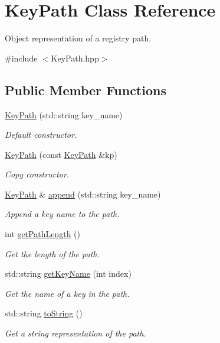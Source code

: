 \hypertarget{class_key_path}{}\section{Key\+Path Class Reference}
\label{class_key_path}


Object representation of a registry path.  




{\ttfamily \#include $<$Key\+Path.\+hpp$>$}

\subsection*{Public Member Functions}
\begin{DoxyCompactItemize}
\item 
\hyperlink{class_key_path_ae333110e571e2126ce2e9a19f4900ab7}{Key\+Path} (std\+::string key\+\_\+name)
\begin{DoxyCompactList}\small\item\em Default constructor. \end{DoxyCompactList}\item 
\hyperlink{class_key_path_af70143f36c7946a29f89e4cc4e5b11e9}{Key\+Path} (const \hyperlink{class_key_path}{Key\+Path} \&kp)
\begin{DoxyCompactList}\small\item\em Copy constructor. \end{DoxyCompactList}\item 
\hyperlink{class_key_path}{Key\+Path} \& \hyperlink{class_key_path_a05e16fcea85250d3d350700246e677b4}{append} (std\+::string key\+\_\+name)
\begin{DoxyCompactList}\small\item\em Append a key name to the path. \end{DoxyCompactList}\item 
int \hyperlink{class_key_path_a3c43f10b8630dfb6fbd3709fb26447f8}{get\+Path\+Length} ()
\begin{DoxyCompactList}\small\item\em Get the length of the path. \end{DoxyCompactList}\item 
std\+::string \hyperlink{class_key_path_a3a69deab570f0025d50c55a8abea0e2d}{get\+Key\+Name} (int index)
\begin{DoxyCompactList}\small\item\em Get the name of a key in the path. \end{DoxyCompactList}\item 
std\+::string \hyperlink{class_key_path_a1290b998befc7e45d650f3e3fc5cbd35}{to\+String} ()
\begin{DoxyCompactList}\small\item\em Get a string representation of the path. \end{DoxyCompactList}\end{DoxyCompactItemize}


